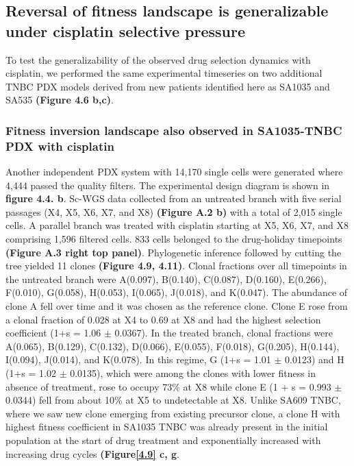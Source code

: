 
\subsection{Reversal of fitness landscape is generalizable under cisplatin selective pressure}
To test the generalizability of the observed drug selection dynamics with cisplatin, we performed the same experimental timeseries on two additional TNBC PDX models derived from new patients identified here as SA1035 and SA535 \textbf{(Figure 4.6 b,c)}. 

\subsubsection{Fitness inversion landscape also observed in SA1035-TNBC PDX with cisplatin}
Another independent PDX system with 14,170 single cells were generated where 4,444 passed the quality filters. The experimental design diagram is shown in \textbf{figure 4.4. b}.
Sc-WGS data collected from an untreated branch with five serial passages (X4, X5, X6, X7, and X8) \textbf{(Figure A.2 b)} with a total of 2,015 single cells. A parallel branch was treated with cisplatin starting at X5, X6, X7, and X8 comprising 1,596 filtered cells. 833 cells belonged to the drug-holiday timepoints \textbf{(Figure A.3 right top panel)}. Phylogenetic inference followed by cutting the tree yielded 11 clones \textbf{(Figure 4.9, 4.11)}. Clonal fractions over all timepoints in the untreated branch were A(0.097), B(0.140), C(0.087), D(0.160), E(0.266), F(0.010), G(0.058), H(0.053), I(0.065), J(0.018), and K(0.047). The abundance of clone A fell over time and it was chosen as the reference clone. Clone E rose from a clonal fraction of 0.028 at X4 to 0.69 at X8 and had the highest selection coefficient (1+s = 1.06 $\pm$ 0.0367). In the treated branch, clonal fractions were A(0.065), B(0.129), C(0.132), D(0.066), E(0.055), F(0.018), G(0.205), H(0.144), I(0.094), J(0.014), and K(0.078). In this regime, G (1+s = 1.01 $\pm$ 0.0123) and H (1+s = 1.02 $\pm$ 0.0135), which were among the clones with lower fitness in absence of treatment, rose to occupy 73\% at X8 while clone E (1 + s = 0.993 $\pm$ 0.0344) fell from about 10\% at X5 to undetectable at X8. Unlike SA609 TNBC, where we saw new clone emerging from existing precursor clone, a clone H with highest fitness coefficient in SA1035 TNBC was already present in the initial population at the start of drug treatment and exponentially increased with increasing drug cycles \textbf{(Figure\ref{4.9} c, g}. 

